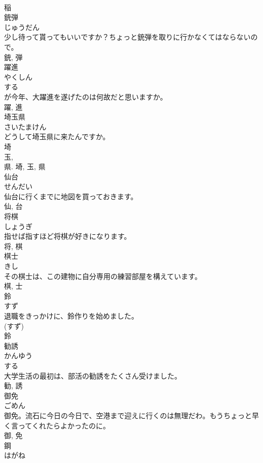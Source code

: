 \documentclass[8pt]{extreport}
\begin{document}
\begin{CJK}{UTF8}{min}
\\	稲	
\\	銃弾	
\\	じゅうだん	
\\	少し待って貰ってもいいですか？ちょっと銃弾を取りに行かなくてはならないので。	
\\	銃, 弾	
\\	躍進	
\\	やくしん	
\\	する 
\\	が今年、大躍進を遂げたのは何故だと思いますか。	
\\	躍, 進	
\\	埼玉県	
\\	さいたまけん	
\\	どうして埼玉県に来たんですか。	
\\	埼 
\\	玉, 
\\	県.	埼, 玉, 県	
\\	仙台	
\\	せんだい	
\\	仙台に行くまでに地図を買っておきます。	
\\	仙, 台	
\\	将棋	
\\	しょうぎ	
\\	指せば指すほど将棋が好きになります。	
\\	将, 棋	
\\	棋士	
\\	きし	
\\	その棋士は、この建物に自分専用の練習部屋を構えています。	
\\	棋, 士	
\\	鈴	
\\	すず	
\\	退職をきっかけに、鈴作りを始めました。	
\\	(すず) 
\\	鈴	
\\	勧誘	
\\	かんゆう	
\\	する 
\\	大学生活の最初は、部活の勧誘をたくさん受けました。	
\\	勧, 誘	
\\	御免	
\\	ごめん	
\\	御免。流石に今日の今日で、空港まで迎えに行くのは無理だわ。もうちょっと早く言ってくれたらよかったのに。	
\\	御, 免	
\\	鋼	
\\	はがね	

\end{CJK}
\end{document}
